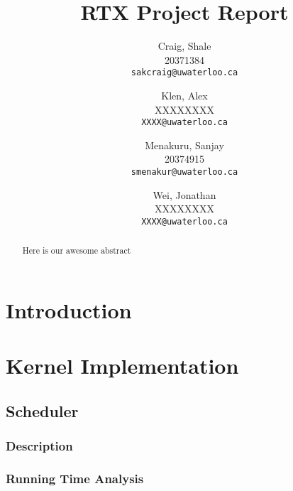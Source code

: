 \documentclass[12pt]{report}
\begin{document}

\title{RTX Project Report}

\author{
    Craig, Shale\\
    20371384\\
    \texttt{sakcraig@uwaterloo.ca}
    \and
    Klen, Alex\\
    XXXXXXXX\\
    \texttt{XXXX@uwaterloo.ca}
    \and
    Menakuru, Sanjay\\
    20374915\\
    \texttt{smenakur@uwaterloo.ca}
    \and
    Wei, Jonathan\\
    XXXXXXXX\\
    \texttt{XXXX@uwaterloo.ca}
}

\maketitle

\begin{abstract}
    Here is our awesome abstract
\end{abstract}

\tableofcontents
\listofalgorithms
\listoffigures



\part{Introduction}

\part{Kernel Implementation}

\chapter{Scheduler}

\section{Description}

\section{Running Time Analysis}
\end{document}
